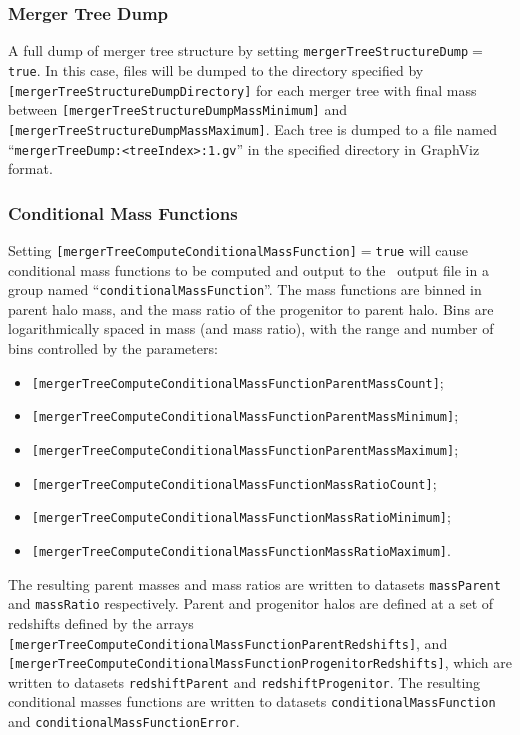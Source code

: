 \subsubsection{Merger Tree Dump}

A full dump of merger tree structure by setting {\tt mergerTreeStructureDump}$=${\tt true}. In this case, files will be dumped to the directory specified by {\tt [mergerTreeStructureDumpDirectory]} for each merger tree with final mass between {\tt [mergerTreeStructureDumpMassMinimum]} and {\tt [mergerTreeStructureDumpMassMaximum]}. Each tree is dumped to a file named ``{\tt mergerTreeDump:\textless treeIndex\textgreater:1.gv}'' in the specified directory in {\sc GraphViz} format.

\subsubsection{Conditional Mass Functions}

Setting {\tt [mergerTreeComputeConditionalMassFunction]}$=${\tt true} will cause conditional mass functions to be computed and output to the \glc\ output file in a group named ``{\tt conditionalMassFunction}''. The mass functions are binned in parent halo mass, and the mass ratio of the progenitor to parent halo. Bins are logarithmically spaced in mass (and mass ratio), with the range and number of bins controlled by the parameters:
\begin{itemize}
\item {\tt [mergerTreeComputeConditionalMassFunctionParentMassCount]};
\item {\tt [mergerTreeComputeConditionalMassFunctionParentMassMinimum]};
\item {\tt [mergerTreeComputeConditionalMassFunctionParentMassMaximum]};
\item {\tt [mergerTreeComputeConditionalMassFunctionMassRatioCount]};
\item {\tt [mergerTreeComputeConditionalMassFunctionMassRatioMinimum]};
\item {\tt [mergerTreeComputeConditionalMassFunctionMassRatioMaximum]}.
\end{itemize}
The resulting parent masses and mass ratios are written to datasets {\tt massParent} and {\tt massRatio} respectively. Parent and progenitor halos are defined at a set of redshifts defined by the arrays {\tt [mergerTreeComputeConditionalMassFunctionParentRedshifts]}, and {\tt [mergerTreeComputeConditionalMassFunctionProgenitorRedshifts]}, which are written to datasets {\tt redshiftParent} and {\tt redshiftProgenitor}. The resulting conditional masses functions are written to datasets {\tt conditionalMassFunction} and {\tt conditionalMassFunctionError}.

